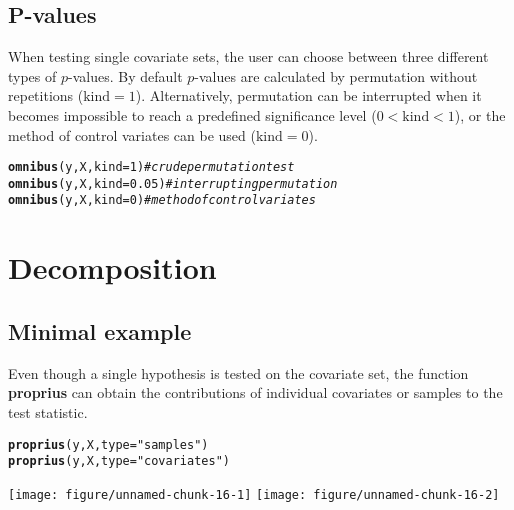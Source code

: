 \documentclass{article}\usepackage[]{graphicx}\usepackage[]{color}
\makeatletter
\def\maxwidth{ %
  \ifdim\Gin@nat@width>\linewidth
    \linewidth
  \else
    \Gin@nat@width
  \fi
}
\newcommand{\hlnum}[1]{\textcolor[rgb]{0.686,0.059,0.569}{#1}}%
\newcommand{\hlstr}[1]{\textcolor[rgb]{0.192,0.494,0.8}{#1}}%
\newcommand{\hlcom}[1]{\textcolor[rgb]{0.678,0.584,0.686}{\textit{#1}}}%
\newcommand{\hlstd}[1]{\textcolor[rgb]{0.345,0.345,0.345}{#1}}%
\newcommand{\hlkwc}[1]{\textcolor[rgb]{0.333,0.667,0.333}{#1}}%
\newcommand{\hlkwd}[1]{\textcolor[rgb]{0.737,0.353,0.396}{\textbf{#1}}}%
\newenvironment{kframe}{%
 \def\at@end@of@kframe{}%
 \ifinner\ifhmode%
  \def\at@end@of@kframe{\end{minipage}}%
  \begin{minipage}{\columnwidth}%
 \fi\fi%
 \def\FrameCommand##1{\hskip\@totalleftmargin \hskip-\fboxsep
 \colorbox{shadecolor}{##1}\hskip-\fboxsep
     \hskip-\linewidth \hskip-\@totalleftmargin \hskip\columnwidth}%
 \MakeFramed {\advance\hsize-\width
   \@totalleftmargin\z@ \linewidth\hsize
   \@setminipage}}%
 {\par\unskip\endMakeFramed%
 \at@end@of@kframe}
\newenvironment{knitrout}{}{} %
\makeatother
\begin{document}
\subsection{P-values}
\label{TOA P-values}

When testing single covariate sets, the user can choose between three different types of \mbox{$p$-values}. By default \mbox{$p$-values} are calculated by permutation without repetitions ($\mathrm{kind}=1$). Alternatively, permutation can be interrupted when it becomes impossible to reach a predefined significance level ($0 < \mathrm{kind} < 1$), or the method of control variates can be used ($\mathrm{kind}=0$).

\begin{knitrout}
\color{fgcolor}\begin{kframe}
\begin{alltt}
\hlkwd{omnibus}\hlstd{(y,X,}\hlkwc{kind}\hlstd{=}\hlnum{1}\hlstd{)} \hlcom{# crude permutation test}
\hlkwd{omnibus}\hlstd{(y,X,}\hlkwc{kind}\hlstd{=}\hlnum{0.05}\hlstd{)} \hlcom{# interrupting permutation}
\hlkwd{omnibus}\hlstd{(y,X,}\hlkwc{kind}\hlstd{=}\hlnum{0}\hlstd{)} \hlcom{# method of control variates}
\end{alltt}
\end{kframe}
\end{knitrout}

\newpage %
\section{Decomposition} %
\label{DCN} %

\subsection{Minimal example}
\label{DCN Minimal example}

Even though a single hypothesis is tested on the covariate set, the function \textbf{proprius} can obtain the contributions of individual covariates or samples to the test statistic. 
\begin{knitrout}
\color{fgcolor}\begin{kframe}
\begin{alltt}
\hlkwd{proprius}\hlstd{(y,X,}\hlkwc{type}\hlstd{=}\hlstr{"samples"}\hlstd{)}
\hlkwd{proprius}\hlstd{(y,X,}\hlkwc{type}\hlstd{=}\hlstr{"covariates"}\hlstd{)}
\end{alltt}
\end{kframe}
\texttt{[image: figure/unnamed-chunk-16-1]} 
\texttt{[image: figure/unnamed-chunk-16-2]} 

\end{knitrout}
\end{document}

